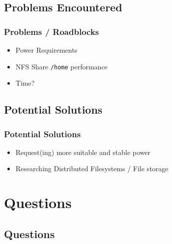 \documentclass{beamer}
\begin{document}
\subsection{Problems Encountered}
\begin{frame}
\frametitle{Problems / Roadblocks}
\begin{itemize}
\item{Power Requirements}
\item{NFS Share \texttt{/home} performance}
\item{Time?}
\end{itemize}
\end{frame}
\subsection{Potential Solutions}
\begin{frame}
\frametitle{Potential Solutions}
\begin{itemize}
\item{Request(ing) more suitable and stable power}
\item{Researching Distributed Filesystems / File storage}
\end{itemize}
\end{frame}

\section*{Questions}
\subsection*{Questions}
\end{document}

